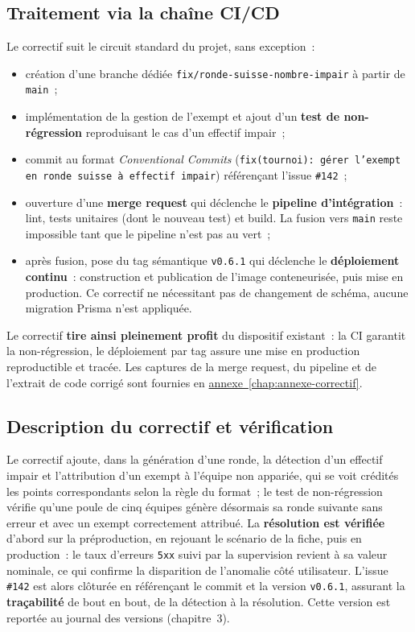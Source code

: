 \subsection{Traitement via la chaîne CI/CD}
Le correctif suit le circuit standard du projet, sans exception~:
\begin{itemize}
    \item création d'une branche dédiée \texttt{fix/ronde-suisse-nombre-impair} à partir de \texttt{main}~;
    \item implémentation de la gestion de l'exempt et ajout d'un \textbf{test de non-régression} reproduisant le cas d'un effectif impair~;
    \item commit au format \emph{Conventional Commits} (\texttt{fix(tournoi): gérer l'exempt en ronde suisse à effectif impair}) référençant l'issue \texttt{\#142}~;
    \item ouverture d'une \textbf{merge request} qui déclenche le \textbf{pipeline d'intégration}~: lint, tests unitaires (dont le nouveau test) et build. La fusion vers \texttt{main} reste impossible tant que le pipeline n'est pas au vert~;
    \item après fusion, pose du tag sémantique \texttt{v0.6.1} qui déclenche le \textbf{déploiement continu}~: construction et publication de l'image conteneurisée, puis mise en production. Ce correctif ne nécessitant pas de changement de schéma, aucune migration Prisma n'est appliquée.
\end{itemize}
Le correctif \textbf{tire ainsi pleinement profit} du dispositif existant~: la CI garantit la non-régression, le déploiement par tag assure une mise en production reproductible et tracée. Les captures de la merge request, du pipeline et de l'extrait de code corrigé sont fournies en \hyperref[chap:annexe-correctif]{annexe~\ref*{chap:annexe-correctif}}.

\subsection{Description du correctif et vérification}
Le correctif ajoute, dans la génération d'une ronde, la détection d'un effectif impair et l'attribution d'un exempt à l'équipe non appariée, qui se voit crédités les points correspondants selon la règle du format~; le test de non-régression vérifie qu'une poule de cinq équipes génère désormais sa ronde suivante sans erreur et avec un exempt correctement attribué. La \textbf{résolution est vérifiée} d'abord sur la préproduction, en rejouant le scénario de la fiche, puis en production~: le taux d'erreurs \texttt{5xx} suivi par la supervision revient à sa valeur nominale, ce qui confirme la disparition de l'anomalie côté utilisateur. L'issue \texttt{\#142} est alors clôturée en référençant le commit et la version \texttt{v0.6.1}, assurant la \textbf{traçabilité} de bout en bout, de la détection à la résolution. Cette version est reportée au journal des versions (chapitre~3).

